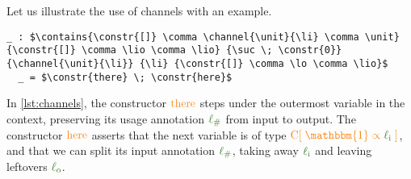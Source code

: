 \documentclass[a4paper,UKenglish,cleveref,autoref,thm-restate,authorcolumns]{lipics-v2019}
\theoremstyle{definition}
\newcommand{\type}[1]{\textcolor{BlueViolet}{\operatorname{#1}}}
\newcommand{\constr}[1]{\textcolor{BurntOrange}{\operatorname{#1}}}
\newcommand{\func}[1]{\textcolor{OliveGreen}{\operatorname{#1}}}
\newcommand{\suc}{\constr{\scriptstyle 1+}}
\newcommand{\unit}{\constr{\mathbbm{1}}}
\newcommand{\channel}[2]{\constr{C[} \; #1 \; \constr{\propto} \; #2 \; \constr{]}}
\newcommand{\comma}{\; \constr{,} \;}
\newcommand{\li}{\func{\ell_i}}
\newcommand{\lo}{\func{\ell_o}}
\newcommand{\lio}{\func{\ell_{\#}}}
\newcommand{\contains}[6]{#1 \; \type{\propto} \; #2 \; \type{\ni}_{#3} \; #4 \; \type{\propto} \; #5 \; \type{\boxtimes} \; #6}
\begin{document}
\begin{example}
  Let us illustrate the use of channels with an example.
  \begin{lstlisting}[label=lst:channels,mathescape,caption=The underscore \_ introduces an anonymous declaration immediately followed by its definition.]
  _ : $\contains{\constr{[]} \comma \channel{\unit}{\li} \comma \unit} {\constr{[]} \comma \lio \comma \lio} {\suc \; \constr{0}} {\channel{\unit}{\li}} {\li} {\constr{[]} \comma \lo \comma \lio}$
  _ = $\constr{there} \; \constr{here}$
  \end{lstlisting}
  In \autoref{lst:channels}, the constructor $\constr{there}$ steps under the outermost variable in the context, preserving its usage annotation $\lio$ from input to output.
  The constructor $\constr{here}$ asserts that the next variable is of type $\channel{\unit}{\li}$, and that we can split its input annotation $\lio$, taking away $\li$ and leaving leftovers $\lo$.
\end{example}
\end{document}
